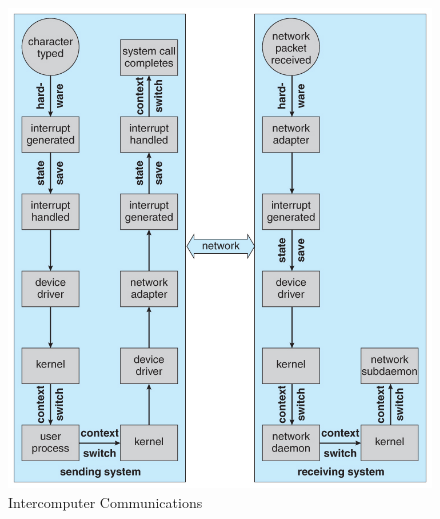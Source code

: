 \begin{figure}[h!tbp]
  \centering
  \includegraphics[scale=1.00]{./Drawings/EDAF35-Operating_Systems/Intercomputer_Communications.jpg}
  \caption{Intercomputer Communications}
  \label{fig:Intercomputer_Communications}
\end{figure}


